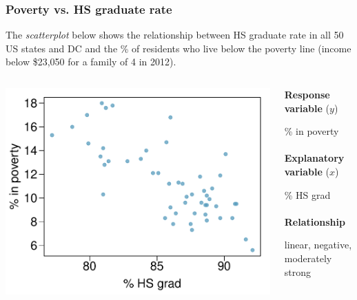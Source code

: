 \documentclass{beamer}
\begin{document}
\begin{frame}
\frametitle{Poverty vs. HS graduate rate}

The \textit{scatterplot} below shows the relationship between HS graduate rate in all 50 US states and DC and the \% of residents who live below the poverty line {\small (income below \$23,050 for a family of 4 in 2012)}.

\begin{columns}
\begin{column}{0.55\textwidth}
\begin{center}
\includegraphics[width=\textwidth]{plots/poverty_hsgrad}
\end{center}
\end{column}
\begin{column}{.45\textwidth}
\pause
\textbf{Response variable} ($y$)

\pause
\% in poverty\\~\\

\pause
\textbf{Explanatory variable} ($x$)

\pause
{\% HS grad}\\~\\

\pause
\textbf{Relationship}

\pause
{linear, negative, moderately strong}
\end{column}
\end{columns}
\end{frame}
\end{document}
